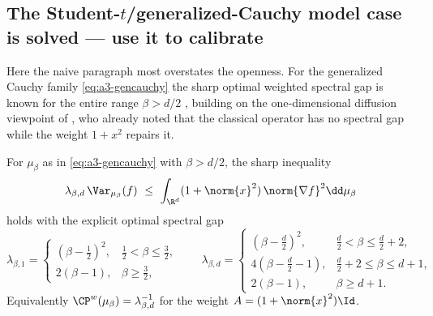 \documentclass[../../main.tex]{subfiles}
\begin{document}
\subsection{The \texorpdfstring{Student-$t$}{Student-t}/generalized-Cauchy model case is solved --- use it to calibrate}
\label{subsec:a3-student}

Here the naive paragraph most overstates the openness. For the generalized Cauchy family
\eqref{eq:a3-gencauchy} the sharp optimal weighted spectral gap is known for the entire range
$\beta>d/2$ \cite{Huguet2024Cauchy}, building on the one-dimensional diffusion viewpoint of
\cite{BonnefontJoulinMa2016}, who already noted that the classical operator has no spectral gap
while the weight $1+x^2$ repairs it.

\begin{theorem}
\label{thm:a3-student}
For $\mu_\beta$ as in \eqref{eq:a3-gencauchy} with $\beta>d/2$, the sharp inequality
\[
  \lambda_{\beta,d}\,\Var_{\mu_\beta}(f)\ \le\ \int_{\R^d}(1+\norm{x}^2)\,\norm{\nabla f}^2\dd\mu_\beta
\]
holds with the explicit optimal spectral gap
\[
  \lambda_{\beta,1}=
  \begin{cases}
    (\beta-\tfrac12)^2, & \tfrac12<\beta\le\tfrac32,\\[1mm]
    2(\beta-1), & \beta\ge\tfrac32,
  \end{cases}
  \qquad
  \lambda_{\beta,d}=
  \begin{cases}
    (\beta-\tfrac d2)^2, & \tfrac d2<\beta\le\tfrac d2+2,\\[1mm]
    4(\beta-\tfrac d2-1), & \tfrac d2+2\le\beta\le d+1,\\[1mm]
    2(\beta-1), & \beta\ge d+1.
  \end{cases}
\]
Equivalently $\CP^{w}(\mu_\beta)=\lambda_{\beta,d}^{-1}$ for the weight $A=(1+\norm{x}^2)\Id$.
\end{theorem}
\end{document}
